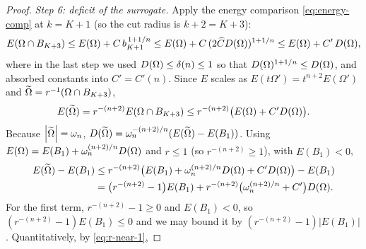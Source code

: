 \begin{proof}
\smallskip
\emph{Step 6: deficit of the surrogate.}
Apply the energy comparison \eqref{eq:energy-comp} at $k=K+1$ (so the
cut radius is $k+2=K+3$):
\[
   E(\Omega\cap B_{K+3})\le E(\Omega)+C\,b_{K+1}^{\,1+1/n}
   \le E(\Omega)+C\,(2\widehat C D(\Omega))^{1+1/n}
   \le E(\Omega)+C'\,D(\Omega),
\]
where in the last step we used $D(\Omega)\le\delta(n)\le1$ so that
$D(\Omega)^{1+1/n}\le D(\Omega)$, and absorbed constants into
$C'=C'(n)$.
Since $E$ scales as
$E(t\Omega')=t^{n+2}E(\Omega')$ and $\widetilde{\Omega}=r^{-1}(\Omega\cap B_{K+3})$,
\[
   E(\widetilde{\Omega})=r^{-(n+2)}E(\Omega\cap B_{K+3})
   \le r^{-(n+2)}\bigl(E(\Omega)+C'D(\Omega)\bigr).
\]
Because $\left|\widetilde{\Omega}\right|=\omega_n$,
$D(\widetilde{\Omega})=\omega_n^{-(n+2)/n}(E(\widetilde{\Omega})-E(B_1))$. Using
$E(\Omega)=E(B_1)+\omega_n^{(n+2)/n}D(\Omega)$ and $r\le1$ (so
$r^{-(n+2)}\ge1$), with $E(B_1)<0$,
\begin{align*}
   E(\widetilde{\Omega})-E(B_1)
   &\le r^{-(n+2)}\bigl(E(B_1)+\omega_n^{(n+2)/n}D(\Omega)+C'D(\Omega)\bigr)-E(B_1)\\
   &=\bigl(r^{-(n+2)}-1\bigr)E(B_1)
     +r^{-(n+2)}\bigl(\omega_n^{(n+2)/n}+C'\bigr)D(\Omega).
\end{align*}
For the first term, $r^{-(n+2)}-1\ge0$ and $E(B_1)<0$, so
$(r^{-(n+2)}-1)E(B_1)\le0$ and we may bound it by
$(r^{-(n+2)}-1)|E(B_1)|$.
Quantitatively, by \eqref{eq:r-near-1},

\end{proof}
